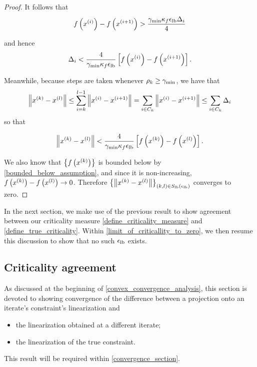 \begin{proof}
It follows that
\begin{align*}
f\left(x^{(i)}\right) - f\left(x^{(i+1)}\right) > \frac{\gamma_{\textrm{min}} \kappa_f {\epsilon_{\textrm{lb}}} \Delta_i}{4}
\end{align*}

and hence
\begin{align*}
\Delta_i < \frac{4}{\gamma_{\textrm{min}} \kappa_f {\epsilon_{\textrm{lb}}}} \left[ f\left(x^{(i)}\right) - f\left(x^{(i+1)}\right)\right].
\end{align*}

Meanwhile, because steps are taken whenever $\rho_k \ge \gamma_{\textrm{min}}$, we have that
\begin{align*}
\left\|x^{(k)} - {x^{(l)}}\right\| \le \sum_{i = k}^{l-1}\left\|x^{(i)} - x^{(i+1)}\right\| = \sum_{i \in C_k}\left\|x^{(i)} - x^{(i+1)}\right\| \le \sum_{i \in C_k} \Delta_i
\end{align*}
so that

\begin{align}
\left\|x^{(k)} - {x^{(l)}}\right\| < \frac{4}{\gamma_{\textrm{min}} \kappa_f {\epsilon_{\textrm{lb}}}} \left[ f\left(x^{(k)}\right) - f\left({x^{(l)}}\right)\right].
\end{align}


We also know that $\left\{f\left(x^{(k)}\right)\right\}$ is bounded below by \cref{bounded_below_assumption}, 
and since it is non-increasing, $f\left(x^{(k)}\right)  - f\left({x^{(l)}}\right) \to 0$.
Therefore $\left\{\left\|x^{(k)} - {x^{(l)}}\right\|\right\}_{(k,l) \in {S_{\textrm{lb}}\left(\epsilon_{\textrm{lb}}\right)}}$ converges to zero.
\end{proof}

In the next section, we make use of the previous result to show agreement between our criticality measure
\cref{define_criticality_measure} and \cref{define_true_criticality}.
Within \cref{limit_of_criticallity_to_zero}, we then resume this discussion to show that no such ${\epsilon_{\textrm{lb}}}$ exists.


\subsection{Criticality agreement}
\label{bounding_the_projection_section}

As discussed at the beginning of \cref{convex_convergence_analysis}, this section is devoted to showing convergence of the difference
between a projection onto an iterate's constraint's linearization and
\begin{itemize}
\item the linearization obtained at a different iterate; 
\item the linearization of the true constraint.
\end{itemize}
This result will be required within \cref{convergence_section}.

